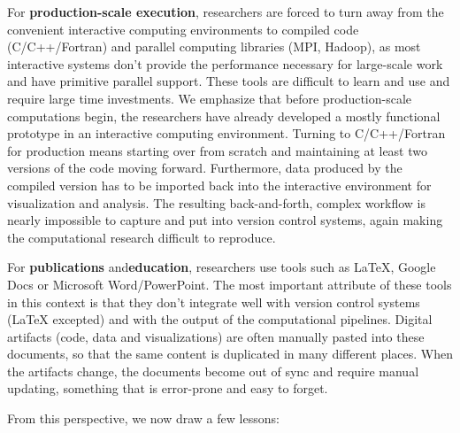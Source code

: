 \documentclass[ChapterTOCs,krantz2]{krantz} %
\begin{document}
For \textbf{production-scale execution}, researchers are forced to turn away
from the convenient interactive computing environments to compiled code
(C/C++/Fortran) and parallel computing libraries (MPI, Hadoop), as most
interactive systems don't provide the performance necessary for large-scale
work and have primitive parallel support.  These tools are difficult to learn
and use and require large time investments. We emphasize that before
production-scale computations begin, the researchers have already developed a
mostly functional prototype in an interactive computing environment. Turning to
C/C++/Fortran for production means starting over from scratch and maintaining
at least two versions of the code moving forward. Furthermore, data produced by
the compiled version has to be imported back into the interactive environment
for visualization and analysis. The resulting back-and-forth, complex workflow
is nearly impossible to capture and put into version control systems, again
making the computational research difficult to reproduce.

For \textbf{publications} and\textbf{education}, researchers use tools such as
\LaTeX, Google Docs or Microsoft Word/PowerPoint.  The most important attribute
of these tools in this context is that they don't integrate well with version
control systems (\LaTeX{} excepted) and with the output of the computational
pipelines. Digital artifacts (code, data and visualizations) are often manually
pasted into these documents, so that the same content is duplicated in many
different places. When the artifacts change, the documents become out of sync
and require manual updating, something that is error-prone and easy to forget.

From this perspective, we now draw a few lessons:
\end{document}
